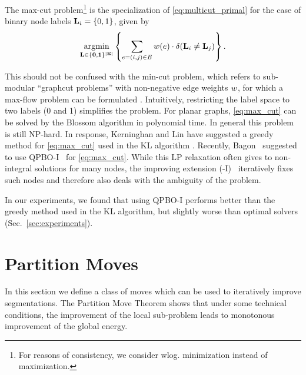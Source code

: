 The max-cut problem\footnote{%
For reasons of consistency, we consider wlog. minimization instead of maximization.
}
is the specialization of \eqref{eq:multicut_primal}
for the case of binary node labels $\mathbf{L}_i = \{0,1\}$, given by
\begin{align}
\operatorname*{\arg\!\min}_{\mathbf{L \in \{0,1\}^{|E|}}}
         \left\{
            \sum_{e=(i,j)\in E} w(e)
                \cdot \delta( \mathbf{L}_i \neq \mathbf{L}_j )
         \right\}
         \label{eq:max_cut}.
\end{align}

This should not be confused with the min-cut problem, which refers to
sub-modular ``graphcut problems'' with non-negative edge weights
$w$, for which a max-flow problem can be formulated
\cite{kolmogorov_2004_pami}.
%
Intuitively, restricting the label space to two labels (0 and 1) simplifies the
problem.
%
For planar graphs, \eqref{eq:max_cut} can be solved by the
Blossom algorithm \cite{schraudolph_2009_nips} in polynomial time.
In general this problem is still NP-hard.
%
In response, Kerninghan and Lin have suggested a greedy method
for \eqref{eq:max_cut} used in the
KL algorithm \cite{kerninghan_1970_bell}. Recently,
Bagon~\cite{bagon_2011_arxiv} suggested to use
\mbox{QPBO-I}~\cite{rother_2007_cvpr} for \eqref{eq:max_cut}.
While this LP relaxation 
often gives to non-integral solutions for many nodes, the improving
extension (-I)~\cite{rother_2007_cvpr} iteratively fixes such nodes and
therefore also deals with the ambiguity of the problem.

In our experiments, we found that using \mbox{QPBO-I} performs 
better than the greedy method used in the KL algorithm,
but slightly worse than optimal solvers (Sec.~\ref{sec:experiments}).





\section{Partition Moves\label{sec:cut_moves}}
\noindent
In this section we define a class of moves which can be used to iteratively
improve segmentations. The Partition Move Theorem shows that under some
technical conditions, the improvement of the local sub-problem 
leads to monotonous improvement of the global energy.

